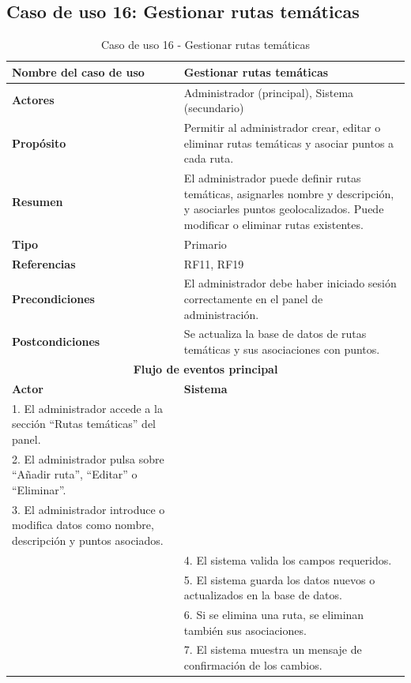 \clearpage
\subsection{Caso de uso 16: Gestionar rutas temáticas}

\begin{table}[H]
\centering
\caption{Caso de uso 16 - Gestionar rutas temáticas}
\begin{tabular}{|p{4.5cm}|p{10.5cm}|}
\hline
\textbf{Nombre del caso de uso} & Gestionar rutas temáticas \\
\hline
\textbf{Actores} & Administrador (principal), Sistema (secundario) \\
\hline
\textbf{Propósito} & Permitir al administrador crear, editar o eliminar rutas temáticas y asociar puntos a cada ruta. \\
\hline
\textbf{Resumen} & El administrador puede definir rutas temáticas, asignarles nombre y descripción, y asociarles puntos geolocalizados. Puede modificar o eliminar rutas existentes. \\
\hline
\textbf{Tipo} & Primario \\
\hline
\textbf{Referencias} & RF11, RF19 \\
\hline
\textbf{Precondiciones} & El administrador debe haber iniciado sesión correctamente en el panel de administración. \\
\hline
\textbf{Postcondiciones} & Se actualiza la base de datos de rutas temáticas y sus asociaciones con puntos. \\
\hline
\multicolumn{2}{|c|}{\textbf{Flujo de eventos principal}} \\
\hline
\textbf{Actor} & \textbf{Sistema} \\
\hline
1. El administrador accede a la sección “Rutas temáticas” del panel. & \\
\hline
2. El administrador pulsa sobre “Añadir ruta”, “Editar” o “Eliminar”. & \\
\hline
3. El administrador introduce o modifica datos como nombre, descripción y puntos asociados. & \\
\hline
& 4. El sistema valida los campos requeridos. \\
\hline
& 5. El sistema guarda los datos nuevos o actualizados en la base de datos. \\
\hline
& 6. Si se elimina una ruta, se eliminan también sus asociaciones. \\
\hline
& 7. El sistema muestra un mensaje de confirmación de los cambios. \\
\hline
\end{tabular}
\end{table}

